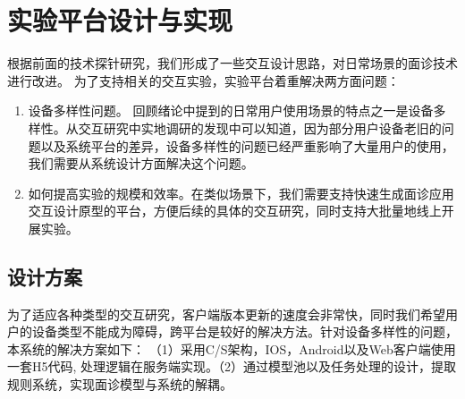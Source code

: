 \chapter{实验平台设计与实现}

根据前面的技术探针研究，我们形成了一些交互设计思路，对日常场景的面诊技术进行改进。
为了支持相关的交互实验，实验平台着重解决两方面问题：

\begin{enumerate}
    \item 设备多样性问题。
回顾绪论中提到的日常用户使用场景的特点之一是设备多样性。从交互研究中实地调研的发现中可以知道，因为部分用户设备老旧的问题以及系统平台的差异，设备多样性的问题已经严重影响了大量用户的使用，我们需要从系统设计方面解决这个问题。

    \item 如何提高实验的规模和效率。在类似场景下，我们需要支持快速生成面诊应用交互设计原型的平台，方便后续的具体的交互研究，同时支持大批量地线上开展实验。
\end{enumerate}






\section{设计方案}


为了适应各种类型的交互研究，客户端版本更新的速度会非常快，同时我们希望用户的设备类型不能成为障碍，跨平台是较好的解决方法。针对设备多样性的问题，本系统的解决方案如下：
（1）采用C/S架构，IOS，Android以及Web客户端使用一套H5代码, 处理逻辑在服务端实现。（2）通过模型池以及任务处理的设计，提取规则系统，实现面诊模型与系统的解耦。


